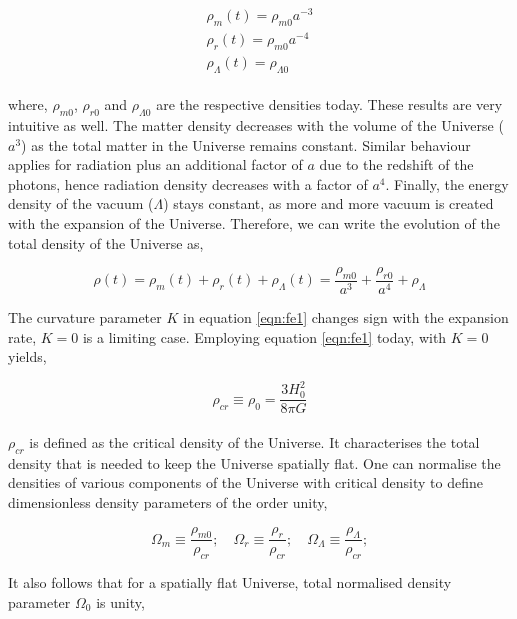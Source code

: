 \documentclass[
  11pt,
  twoside,
  openright,
  titlepage,
  headings=optiontoheadandtoc
]{scrbook}
\begin{document}
\begin{equation}
\begin{array}{l}
\rho_m(t) = \rho_{m0} a^{-3} \\
\rho_r(t) = \rho_{m0} a^{-4} \\
\rho_{\Lambda}(t) = \rho_{\Lambda 0}
\end{array} 
\label{eq:xdef}
\end{equation}
\\ 
where, $\rho_{m0}$, $\rho_{r0}$ and $\rho_{\Lambda 0}$ are the respective densities
today. These results are very intuitive as well. The matter density decreases with the volume 
of the Universe ($a^3$) as the total matter in the Universe remains constant. Similar
behaviour applies for radiation plus an additional factor of $a$ due to the redshift
of the photons, hence radiation density decreases with a factor of $a^4$. Finally, the
energy density of the vacuum ($\Lambda$) stays constant, 
as more and more vacuum is created with the expansion of the Universe. Therefore,
we can write the evolution of the total density of the Universe as,

\begin{equation}
	\rho(t) = \rho_m(t)+\rho_r(t)+\rho_{\Lambda}(t) = \dfrac{\rho_{m0}}{a^3} + 
				\dfrac{\rho_{r0}}{a^4} + \rho_{\Lambda}
	\label{eqn:dens}
\end{equation}



The curvature parameter $K$ in equation \ref{eqn:fe1} changes sign with the expansion 
rate, $K=0$ is a limiting case. Employing equation \ref{eqn:fe1} today, with
$K=0$ yields,

\begin{equation}
	\rho_{cr} \equiv \rho_0 = \dfrac{3H_0^2}{8\pi G}
\end{equation}
\\
$\rho_{cr}$ is defined as the critical density of the Universe. 
It characterises the total density
that is needed to keep the Universe spatially flat. One can normalise the densities of
various components of the Universe with critical density to define dimensionless density
parameters of the order unity,

\begin{equation}
	\Omega_m \equiv \dfrac{\rho_{m0}}{\rho_{cr}};\quad
	\Omega_r \equiv \dfrac{\rho_{r}}{\rho_{cr}};\quad
	\Omega_{\Lambda} \equiv \dfrac{\rho_{\Lambda}}{\rho_{cr}};
	\label{eqn:Omega}
\end{equation}

It also follows that for a spatially flat Universe, total normalised 
density parameter $\Omega_0$ is unity,
\end{document}
